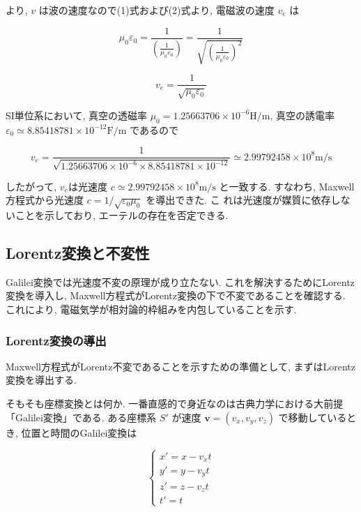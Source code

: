 \documentclass{ltjsarticle}
\begin{document}
より, $v$ は波の速度なので(1)式および(2)式より, 電磁波の速度 $v_e$ は

\begin{equation}
  \mu_0 \varepsilon_0 = \frac{1}{ (\frac{1}{\mu_0 \varepsilon_0}) } = \frac{1}{ \sqrt{(\frac{1}{\mu_0 \varepsilon_0})^2} }
\end{equation}

\begin{equation}
  v_e = \frac{1}{\sqrt{\mu_0 \varepsilon_0}}
\end{equation}

SI単位系において, 真空の透磁率 $\mu_0 = 1.25663706 \times 10^{-6} \mathrm{H/m}$, 真空の誘電率 $\varepsilon_0 \simeq 8.85418781 \times 10^{-12} \mathrm{F/m}$ であるので

\begin{equation}
  v_e = \frac{1}{\sqrt{1.25663706 \times 10^{-6} \times 8.85418781 \times 10^{-12}}} \simeq 2.99792458 \times 10^8 \mathrm{m/s}
\end{equation}

したがって, $v_e$は光速度 $c \simeq 2.99792458 \times 10^8 \mathrm{m/s}$ と一致する. すなわち, Maxwell方程式から光速度 $c = 1/\sqrt{\varepsilon_0 \mu_0}$ を導出できた. こ
れは光速度が媒質に依存しないことを示しており, エーテルの存在を否定できる.

\subsection{Lorentz変換と不変性}
Galilei変換では光速度不変の原理が成り立たない. 
これを解決するためにLorentz変換を導入し, Maxwell方程式がLorentz変換の下で不変であることを確認する. 
これにより, 電磁気学が相対論的枠組みを内包していることを示す. 

\subsubsection{Lorentz変換の導出}
Maxwell方程式がLorentz不変であることを示すための準備として, まずはLorentz変換を導出する. 

そもそも座標変換とは何か. 
一番直感的で身近なのは古典力学における大前提「Galilei変換」である. 
ある座標系 \(S'\) が速度 \(\mathbf{v} = (v_x, v_y, v_z)\) で移動しているとき, 
位置と時間のGalilei変換は

\begin{equation}
\begin{cases}
x' = x - v_x t \\
y' = y - v_y t \\
z' = z - v_z t \\
t' = t
\end{cases}
\end{equation}
\end{document}
